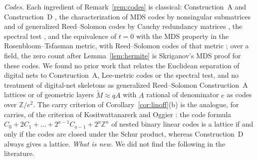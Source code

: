\documentclass[11pt]{amsart}
\theoremstyle{definition}
\theoremstyle{plain}
\newcommand{\Z}{\mathbb{Z}}
\begin{document}
\emph{Codes.} Each ingredient of Remark~\ref{rem:codes} is classical: Construction~A and Construction~D \cite{CS99,BS83}, the characterization of MDS codes by nonsingular submatrices \cite{MS77} and of generalized Reed--Solomon codes by Cauchy redundancy matrices \cite{RS85}, the spectral test \cite{CM67,Knu97}, and the equivalence of $t=0$ with the MDS property in the Rosenbloom--Tsfasman metric, with Reed--Solomon codes of that metric \cite{RT97,Skr01,Nie87}; over a field, the zero count after Lemma~\ref{lem:hermite} is Skriganov's MDS proof for these codes. We found no prior work that relates the Euclidean separation of digital nets to Construction~A, Lee-metric codes or the spectral test, and no treatment of digital-net skeletons as generalized Reed--Solomon Construction~A lattices or of geometric layers $\tilde M\approx qA$ with $A$ rational of denominator $e$ as codes over $\Z/e^2$. The carry criterion of Corollary~\ref{cor:linoff}(b) is the analogue, for carries, of the criterion of Kositwattanarerk and Oggier \cite{KO14}: the code formula $C_0+2C_1+\dots+2^{a-1}C_{a-1}+2^a\Z^n$ of nested binary linear codes is a lattice if and only if the codes are closed under the Schur product, whereas Construction~D always gives a lattice.
\emph{What is new.} We did not find the following in the literature.
\end{document}
